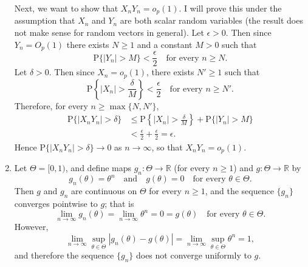 \documentclass[12pt]{article}
\newcommand{\Prob}{\mathrm{P}}
\begin{document}
\begin{enumerate}
Next, we want to show that $X_n Y_n = o_p(1)$. I will prove this under the assumption that $X_n$ and $Y_n$ are both scalar random variables (the result does not make sense for random vectors in general). Let $\epsilon > 0$. Then since $Y_n = O_p(1)$ there exists $N \geq 1$ and a constant $M > 0$ such that
\begin{equation*}
\Prob\{|Y_n| > M\} < \frac{\epsilon}{2} \quad \text{for every $n \geq N$}.
\end{equation*}
Let $\delta > 0$. Then since $X_n = o_p(1)$, there exists $N' \geq 1$ such that
\begin{equation*}
\Prob\left\{|X_n| > \frac{\delta}{M} \right\} < \frac{\epsilon}{2} \quad \text{for every $n \geq N'$}.
\end{equation*}
Therefore, for every $n \geq \max\{N, N'\}$,
\begin{align*}
\Prob\{|X_n Y_n| > \delta\} &\leq \Prob\left\{|X_n| > \frac{\delta}{M}\right\} + \Prob\{|Y_n| > M\} \\
&< \frac{\epsilon}{2} + \frac{\epsilon}{2} = \epsilon.
\end{align*}
Hence $\Prob\{|X_n Y_n| > \delta\} \to 0$ as $n \to \infty$, so that $X_n Y_n = o_p(1)$.

\item
Let $\Theta = [0, 1)$, and define maps $g_n : \Theta \to \mathbb{R}$ (for every $n \geq 1$) and $g : \Theta \to \mathbb{R}$ by
\begin{equation*}
g_n(\theta) = \theta^n \quad \text{and} \quad g(\theta) = 0 \quad \text{for every $\theta \in \Theta$}.
\end{equation*}
Then $g$ and $g_n$ are continuous on $\Theta$ for every $n \geq 1$, and the sequence $\{g_n\}$ converges pointwise to $g$; that is
\begin{equation*}
\lim_{n \to \infty} g_n(\theta) = \lim_{n \to \infty} \theta^n = 0 = g(\theta) \quad \text{for every $\theta \in \Theta$}.
\end{equation*}
However,
\begin{equation*}
\lim_{n \to \infty} \sup_{\theta \in \Theta} |g_n(\theta) - g(\theta)| = \lim_{n \to \infty} \sup_{\theta \in \Theta} \theta^n = 1,
\end{equation*}
and therefore the sequence $\{g_n\}$ does not converge uniformly to $g$.


\end{enumerate}
\end{document}
